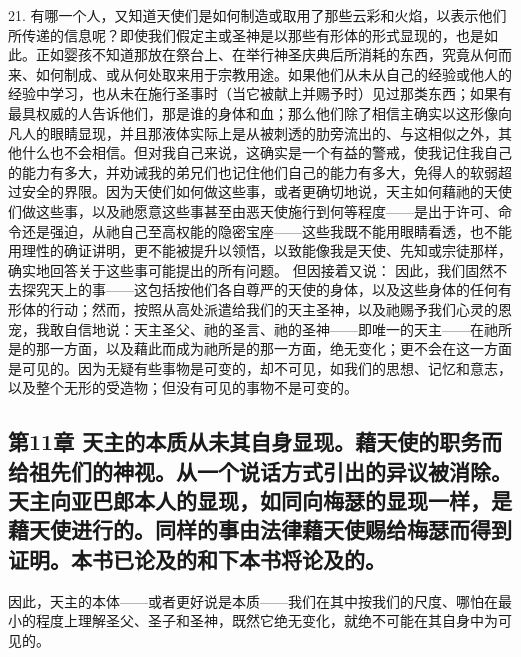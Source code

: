 21. 有哪一个人，又知道天使们是如何制造或取用了那些云彩和火焰，以表示他们所传递的信息呢？即使我们假定主或圣神是以那些有形体的形式显现的，也是如此。正如婴孩不知道那放在祭台上、在举行神圣庆典后所消耗的东西，究竟从何而来、如何制成、或从何处取来用于宗教用途。如果他们从未从自己的经验或他人的经验中学习，也从未在施行圣事时（当它被献上并赐予时）见过那类东西；如果有最具权威的人告诉他们，那是谁的身体和血；那么他们除了相信主确实以这形像向凡人的眼睛显现，并且那液体实际上是从被刺透的肋旁流出的、与这相似之外，其他什么也不会相信。但对我自己来说，这确实是一个有益的警戒，使我记住我自己的能力有多大，并劝诫我的弟兄们也记住他们自己的能力有多大，免得人的软弱超过安全的界限。因为天使们如何做这些事，或者更确切地说，天主如何藉祂的天使们做这些事，以及祂愿意这些事甚至由恶天使施行到何等程度——是出于许可、命令还是强迫，从祂自己至高权能的隐密宝座——这些我既不能用眼睛看透，也不能用理性的确证讲明，更不能被提升以领悟，以致能像我是天使、先知或宗徒那样，确实地回答关于这些事可能提出的所有问题。 但因接着又说： 因此，我们固然不去探究天上的事——这包括按他们各自尊严的天使的身体，以及这些身体的任何有形体的行动；然而，按照从高处派遣给我们的天主圣神，以及祂赐予我们心灵的恩宠，我敢自信地说：天主圣父、祂的圣言、祂的圣神——即唯一的天主——在祂所是的那一方面，以及藉此而成为祂所是的那一方面，绝无变化；更不会在这一方面是可见的。因为无疑有些事物是可变的，却不可见，如我们的思想、记忆和意志，以及整个无形的受造物；但没有可见的事物不是可变的。\par


\subsection{第11章 天主的本质从未其自身显现。藉天使的职务而给祖先们的神视。从一个说话方式引出的异议被消除。天主向亚巴郎本人的显现，如同向梅瑟的显现一样，是藉天使进行的。同样的事由法律藉天使赐给梅瑟而得到证明。本书已论及的和下本书将论及的。}

因此，天主的本体——或者更好说是本质——我们在其中按我们的尺度、哪怕在最小的程度上理解圣父、圣子和圣神，既然它绝无变化，就绝不可能在其自身中为可见的。\par

